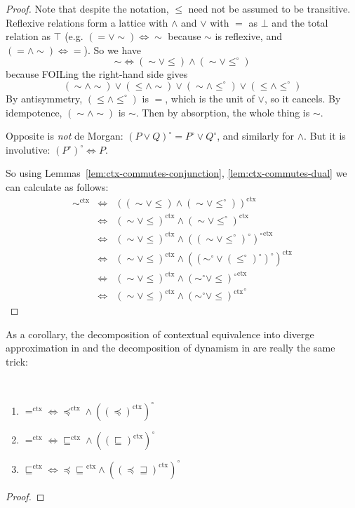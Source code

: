 \documentclass[acmsmall,nonacm]{acmart}
\newcommand{\ltdyn}{\sqsubseteq}
\newcommand{\gtdyn}{\sqsupseteq}
\newcommand{\ctxize}[1]{\mathrel{{#1}^{\text{ctx}}}}
\newcommand\errordivergeleft[0]{\preceq\ltdyn}
\newcommand\errordivergerightop[0]{\preceq\gtdyn}
\begin{document}
{\begin{longonly}
\begin{proof}
Note that despite the notation, $\leqslant$ need not be assumed to be
transitive.  
Reflexive relations form a lattice with $\wedge$ and $\vee$ with $=$ as
$\bot$ and the total relation as $\top$ (e.g. $(= \vee \sim)
\Leftrightarrow \sim$ because $\sim$ is reflexive, and $(= \wedge \sim)
\Leftrightarrow =$).  So we have
\[
\sim \Leftrightarrow (\sim \vee \leqslant) \wedge (\sim \vee \leqslant^\circ)
\]
because FOILing the right-hand side gives
\[
(\sim \wedge \sim) \vee (\leqslant \wedge \sim) \vee (\sim \wedge \leqslant^\circ) \vee (\leqslant \wedge \leqslant^\circ)
\]
By antisymmetry, $(\leqslant \wedge \leqslant^\circ)$ is $=$, which is the
unit of $\vee$, so it cancels.  By idempotence, $(\sim \wedge \sim)$ is $\sim$.
Then by absorption, the whole thing is $\sim$.

Opposite is \emph{not} de Morgan: $(P \vee Q)^\circ = P^\circ \vee
Q^\circ$, and similarly for $\wedge$.  But it is involutive:
$(P^\circ)^\circ \Leftrightarrow P$.  

So using Lemmas~\ref{lem:ctx-commutes-conjunction}, \ref{lem:ctx-commutes-dual} we can calculate as follows:
\[
\begin{array}{rcl}
\ctxize\sim & \Leftrightarrow &\ctxize{((\sim \vee \leqslant) \wedge (\sim \vee \leqslant^\circ))} \\
            & \Leftrightarrow &\ctxize{(\sim \vee \leqslant)} \wedge \ctxize{(\sim \vee \leqslant^\circ)}\\
            & \Leftrightarrow &\ctxize{(\sim \vee \leqslant)} \wedge \ctxize{((\sim \vee \leqslant^\circ)^\circ)^\circ}\\
            & \Leftrightarrow &\ctxize{(\sim \vee \leqslant)} \wedge \ctxize{((\sim^\circ \vee (\leqslant^\circ)^\circ)^\circ)}\\
            & \Leftrightarrow &\ctxize{(\sim \vee \leqslant)} \wedge \ctxize{(\sim^\circ \vee \leqslant)^\circ}\\
            & \Leftrightarrow &\ctxize{(\sim \vee \leqslant)} \wedge \ctxize{(\sim^\circ \vee \leqslant)}^\circ
\end{array}
\]
\end{proof}

As a corollary, the decomposition of contextual equivalence into diverge
approximation in \citet{ahmed06:lr} and the decomposition of dynamism in
\citet{newahmed18} are really the same trick:
\begin{corollary} ~~~ \label{cor:contextual-decomposition}
  \begin{enumerate}
  \item $\ctxize= \mathbin{\Leftrightarrow} \ctxize{\preceq} \wedge
    (\ctxize{(\preceq)})^\circ$
  \item $\ctxize= \mathbin{\Leftrightarrow} \ctxize{\ltdyn} \wedge (\ctxize{(\ltdyn)})^\circ$
  \item $\ctxize\ltdyn \mathbin{\Leftrightarrow} \ctxize{\errordivergeleft} \wedge (\ctxize{(\errordivergerightop)})^\circ$
  \end{enumerate}
\end{corollary}
\begin{proof}


\end{proof}
\end{longonly}}
\end{document}
